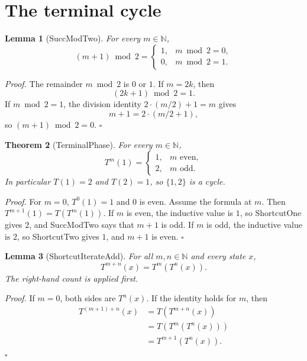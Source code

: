 \documentclass[11pt,letterpaper]{article}
\newcommand{\N}{\mathbb{N}}
\newtheorem{theorem}{Theorem}
\newtheorem{lemma}[theorem]{Lemma}
\newenvironment{proof}{\noindent\textit{Proof.}}{\hfill\(\square\)}
\begin{document}
\section{The terminal cycle}

\begin{lemma}[SuccModTwo]
For every \(m\in\N\),
\[
  (m+1)\bmod 2=
  \begin{cases}
    1,&m\bmod 2=0,\\
    0,&m\bmod 2=1.
  \end{cases}
\]
\end{lemma}

\begin{proof}
The remainder \(m\bmod 2\) is \(0\) or \(1\). If \(m=2k\), then
\[
  (2k+1)\bmod 2=1.
\]
If \(m\bmod 2=1\), the division identity \(2\cdot(m/2)+1=m\) gives
\[
  m+1=2\cdot(m/2+1),
\]
so \((m+1)\bmod 2=0\).
\end{proof}

\begin{theorem}[TerminalPhase]
For every \(m\in\N\),
\[
  T^{m}(1)=
  \begin{cases}
    1,&m\text{ even},\\
    2,&m\text{ odd}.
  \end{cases}
\]
In particular \(T(1)=2\) and \(T(2)=1\), so \(\{1,2\}\) is a cycle.
\end{theorem}

\begin{proof}
For \(m=0\), \(T^{0}(1)=1\) and \(0\) is even. Assume the formula at \(m\). Then \(T^{m+1}(1)=T(T^{m}(1))\). If \(m\) is even, the inductive value is \(1\), so ShortcutOne gives \(2\), and SuccModTwo says that \(m+1\) is odd. If \(m\) is odd, the inductive value is \(2\), so ShortcutTwo gives \(1\), and \(m+1\) is even.
\end{proof}

\begin{lemma}[ShortcutIterateAdd]
For all \(m,n\in\N\) and every state \(x\),
\[
  T^{m+n}(x)=T^{m}(T^{n}(x)).
\]
The right-hand count is applied first.
\end{lemma}

\begin{proof}
If \(m=0\), both sides are \(T^{n}(x)\). If the identity holds for \(m\), then
\begin{align*}
  T^{(m+1)+n}(x)
  &=T(T^{m+n}(x))\\
  &=T(T^{m}(T^{n}(x)))\\
  &=T^{m+1}(T^{n}(x)).
\end{align*}
\end{proof}
\end{document}
